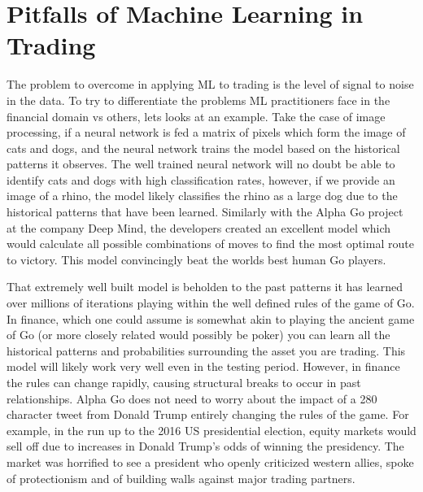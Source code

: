 \documentclass[11pt, a4paper]{article}
\begin{document}
\section{Pitfalls of Machine Learning in Trading}
The problem to overcome in applying ML to trading is the level of signal to noise in the data. To try to differentiate the problems ML practitioners face in the financial domain vs others, lets looks at an example. Take the case of image processing, if a neural network is fed a matrix of pixels which form the image of cats and dogs, and the neural network trains the model based on the historical patterns it observes. The well trained neural network will no doubt be able to identify cats and dogs with high classification rates, however, if we provide an image of a rhino, the model likely classifies the rhino as a large dog due to the historical patterns that have been learned. \newline Similarly with the Alpha Go project \cite{Silver2016} at the company Deep Mind, the developers created an excellent model which would calculate all possible combinations of moves to find the most optimal route to victory. This model convincingly beat the worlds best human Go players.
\par
That extremely well built model is beholden to the past patterns it has learned over millions of iterations playing within the well defined rules of the game of Go. In finance, which one could assume is somewhat akin to playing the ancient game of Go (or more closely related would possibly be poker) you can learn all the historical patterns and probabilities surrounding the asset you are trading. This model will likely work very well even in the testing period. However, in finance the rules can change rapidly, causing structural breaks to occur in past relationships. Alpha Go does not need to worry about the impact of a 280 character tweet from Donald Trump entirely changing the rules of the game.\newline 
For example, in the run up to the 2016 US presidential election, equity markets would sell off due to increases in Donald Trump's odds of winning the presidency. The market was horrified to see a president who openly criticized western allies, spoke of protectionism and of building walls against major trading partners. 
\end{document}
